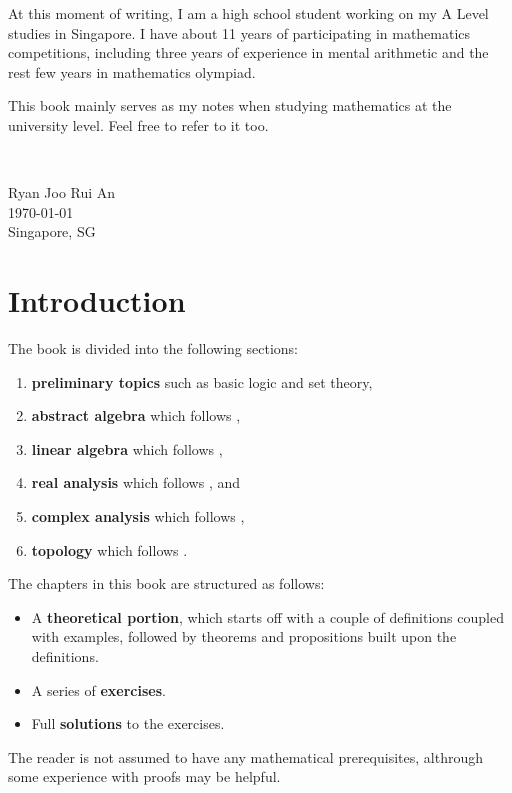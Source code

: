 \documentclass[12pt,a4 paper]{extreport}
\begin{document}
At this moment of writing, I am a high school student working on my A Level studies in Singapore. I have about 11 years of participating in mathematics competitions, including three years of experience in mental arithmetic and the rest few years in mathematics olympiad.

This book mainly serves as my notes when studying mathematics at the university level. Feel free to refer to it too.

\

\begin{flushright}
Ryan Joo Rui An\\
\today\\
Singapore, SG
\end{flushright}
\pagebreak

\chapter*{Introduction}
The book is divided into the following sections:
\begin{enumerate}
\item \textbf{preliminary topics} such as basic logic and set theory, 
\item \textbf{abstract algebra} which follows \cite{dummit-foote}, 
\item \textbf{linear algebra} which follows \cite{hoffman-kunze}, 
\item \textbf{real analysis} which follows \cite{rudin,apostol}, and
\item \textbf{complex analysis} which follows \cite{ahlfors},
\item \textbf{topology} which follows \cite{munkres}.
\end{enumerate}

The chapters in this book are structured as follows:
\begin{itemize}
\item A \textbf{theoretical portion}, which starts off with a couple of definitions coupled with examples, followed by theorems and propositions built upon the definitions.
\item A series of \textbf{exercises}.
\item Full \textbf{solutions} to the exercises.
\end{itemize}

The reader is not assumed to have any mathematical prerequisites, althrough some experience with proofs may be helpful.
\end{document}
